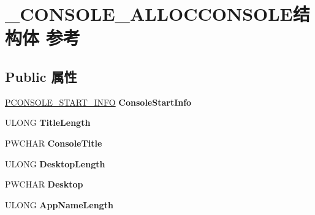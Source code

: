 \hypertarget{struct___c_o_n_s_o_l_e___a_l_l_o_c_c_o_n_s_o_l_e}{}\section{\+\_\+\+C\+O\+N\+S\+O\+L\+E\+\_\+\+A\+L\+L\+O\+C\+C\+O\+N\+S\+O\+L\+E结构体 参考}
\label{struct___c_o_n_s_o_l_e___a_l_l_o_c_c_o_n_s_o_l_e}
\subsection*{Public 属性}
\begin{DoxyCompactItemize}
\item 
\mbox{\label{struct___c_o_n_s_o_l_e___a_l_l_o_c_c_o_n_s_o_l_e_ada1199bb51876157189542f4d518087c}} 
\hyperlink{struct___c_o_n_s_o_l_e___s_t_a_r_t___i_n_f_o}{P\+C\+O\+N\+S\+O\+L\+E\+\_\+\+S\+T\+A\+R\+T\+\_\+\+I\+N\+FO} {\bfseries Console\+Start\+Info}
\item 
\mbox{\label{struct___c_o_n_s_o_l_e___a_l_l_o_c_c_o_n_s_o_l_e_aaefd6bfa22619b3b972f2ddea15a7765}} 
U\+L\+O\+NG {\bfseries Title\+Length}
\item 
\mbox{\label{struct___c_o_n_s_o_l_e___a_l_l_o_c_c_o_n_s_o_l_e_ad06af57a3e1d0e5de54a97116c2dfc90}} 
P\+W\+C\+H\+AR {\bfseries Console\+Title}
\item 
\mbox{\label{struct___c_o_n_s_o_l_e___a_l_l_o_c_c_o_n_s_o_l_e_a9002863bb13ba2abcdc7200e4dd03bf5}} 
U\+L\+O\+NG {\bfseries Desktop\+Length}
\item 
\mbox{\label{struct___c_o_n_s_o_l_e___a_l_l_o_c_c_o_n_s_o_l_e_a037a372e998277686d6e35563761cb27}} 
P\+W\+C\+H\+AR {\bfseries Desktop}
\item 
\mbox{\label{struct___c_o_n_s_o_l_e___a_l_l_o_c_c_o_n_s_o_l_e_aaed425d4fcc5aa7c06a1c6cdb92c7276}} 
U\+L\+O\+NG {\bfseries App\+Name\+Length}
\item 

\end{DoxyCompactItemize}
